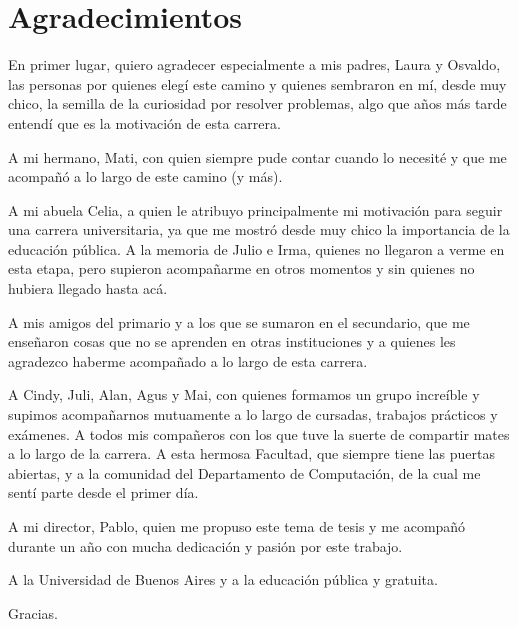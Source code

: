 \chapter*{Agradecimientos}

En primer lugar, quiero agradecer especialmente a mis padres, Laura y Osvaldo, las personas por quienes elegí este camino y quienes sembraron en mí, desde muy chico, la semilla de la curiosidad por resolver problemas, algo que años más tarde entendí que es la motivación de esta carrera.

A mi hermano, Mati, con quien siempre pude contar cuando lo necesité y que me acompañó a lo largo de este camino (y más).

A mi abuela Celia, a quien le atribuyo principalmente mi motivación para seguir una carrera universitaria, ya que me mostró desde muy chico la importancia de la educación pública. A la memoria de Julio e Irma, quienes no llegaron a verme en esta etapa, pero supieron acompañarme en otros momentos y sin quienes no hubiera llegado hasta acá.

A mis amigos del primario y a los que se sumaron en el secundario, que me enseñaron cosas que no se aprenden en otras instituciones y a quienes les agradezco haberme acompañado a lo largo de esta carrera.

A Cindy, Juli, Alan, Agus y Mai, con quienes formamos un grupo increíble y supimos acompañarnos mutuamente a lo largo de cursadas, trabajos prácticos y exámenes. A todos mis compañeros con los que tuve la suerte de compartir mates a lo largo de la carrera. A esta hermosa Facultad, que siempre tiene las puertas abiertas, y a la comunidad del Departamento de Computación, de la cual me sentí parte desde el primer día.

A mi director, Pablo, quien me propuso este tema de tesis y me acompañó durante un año con mucha dedicación y pasión por este trabajo.

A la Universidad de Buenos Aires y a la educación pública y gratuita.

Gracias.